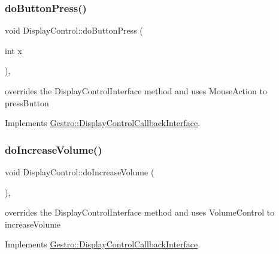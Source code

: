 \subsubsection{\texorpdfstring{do\+Button\+Press()}{doButtonPress()}}
{\footnotesize\ttfamily void Display\+Control\+::do\+Button\+Press (\begin{DoxyParamCaption}\item[{int}]{x }\end{DoxyParamCaption})\hspace{0.3cm}{\ttfamily [override]}, {\ttfamily [virtual]}}

overrides the Display\+Control\+Interface method and uses Mouse\+Action to press\+Button 

Implements \hyperlink{classGestro_1_1DisplayControlCallbackInterface_ab661600cad2743fd41253fb9cabbee51}{Gestro\+::\+Display\+Control\+Callback\+Interface}.

\mbox{\label{classGestro_1_1DisplayControl_a8a361b4c25ef55b86b5c2d178ffa516f}} 
\subsubsection{\texorpdfstring{do\+Increase\+Volume()}{doIncreaseVolume()}}
{\footnotesize\ttfamily void Display\+Control\+::do\+Increase\+Volume (\begin{DoxyParamCaption}{ }\end{DoxyParamCaption})\hspace{0.3cm}{\ttfamily [override]}, {\ttfamily [virtual]}}

overrides the Display\+Control\+Interface method and uses Volume\+Control to increase\+Volume 

Implements \hyperlink{classGestro_1_1DisplayControlCallbackInterface_af26f63171de9622c5723363732f590c8}{Gestro\+::\+Display\+Control\+Callback\+Interface}.

\mbox{\label{classGestro_1_1DisplayControl_aa5af48425f7ba40012b2a7db5fabed45}} 
